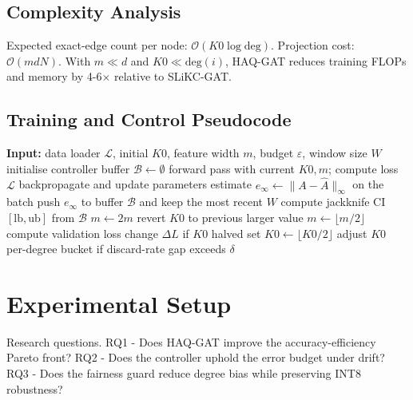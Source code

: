 \documentclass{article} %
\begin{document}
\subsection{Complexity Analysis}
Expected exact-edge count per node: \(\mathcal{O}(K0 \log \mathrm{deg})\). Projection cost: \(\mathcal{O}(m d N)\). With \(m \ll d\) and \(K0 \ll \mathrm{deg}(i)\), HAQ-GAT reduces training FLOPs and memory by 4-6\(\times\) relative to SLiKC-GAT.

\subsection{Training and Control Pseudocode}
\begin{algorithm}[t]
\caption{Epoch Loop with Adaptive Controller}
\begin{algorithmic}[1]
  \State \textbf{Input:} data loader \(\mathcal{L}\), initial \(K0\), feature width \(m\), budget \(\varepsilon\), window size \(W\)
  \State initialise controller buffer \(\mathcal{B} \leftarrow \emptyset\)
      \State forward pass with current \(K0, m\); compute loss \(\mathcal{L}\)
      \State backpropagate and update parameters
      \State estimate \(e_\infty \leftarrow \lVert A - \hat{A} \rVert_\infty\) on the batch
      \State push \(e_\infty\) to buffer \(\mathcal{B}\) and keep the most recent \(W\)
    \EndFor
    \State compute jackknife CI \([\mathrm{lb}, \mathrm{ub}]\) from \(\mathcal{B}\)
        \State \(m \leftarrow 2m\)
      \Else
        \State revert \(K0\) to previous larger value
      \EndIf
      \State \(m \leftarrow \lfloor m/2 \rfloor\)
    \EndIf
    \State compute validation loss change \(\Delta L\) if \(K0\) halved
     \State set \(K0 \leftarrow \lfloor K0/2 \rfloor\) \EndIf
    \State adjust \(K0\) per-degree bucket if discard-rate gap exceeds \(\delta\)
  \EndFor
\end{algorithmic}
\end{algorithm}

\section{Experimental Setup}
\label{sec:experimental}
Research questions. RQ1 - Does HAQ-GAT improve the accuracy-efficiency Pareto front? RQ2 - Does the controller uphold the error budget under drift? RQ3 - Does the fairness guard reduce degree bias while preserving INT8 robustness?
\end{document}
